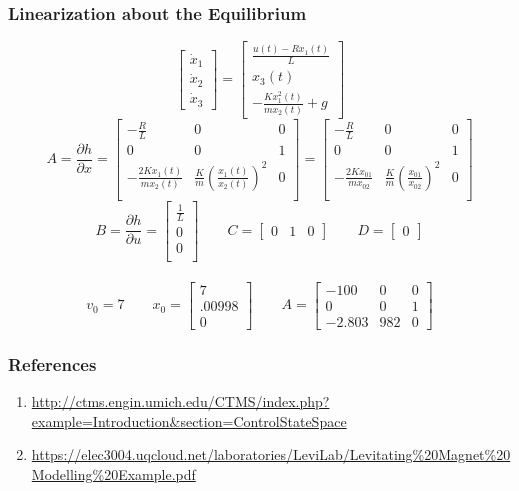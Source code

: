 \documentclass{beamer}
\begin{document}
\begin{frame}
\frametitle{Linearization about the Equilibrium}
$$
\begin{bmatrix}
\dot{x}_1 \\
\dot{x}_2 \\
\dot{x}_3
\end{bmatrix}
=
\begin{bmatrix}
\frac{u(t)-Rx_1(t)}{L} \\
x_3(t) \\
-\frac{Kx_1^2(t)}{mx_2(t)} + g
\end{bmatrix}
$$
$$
A
=
\frac{\partial h}{\partial x}
=
\begin{bmatrix}
-\frac{R}{L} & 0 & 0\\
0 & 0 & 1\\
-\frac{2Kx_1(t)}{mx_2(t)} & \frac{K}{m}(\frac{x_1(t)}{x_2(t)})^2 & 0\\
\end{bmatrix}
=
\begin{bmatrix}
-\frac{R}{L} & 0 & 0\\
0 & 0 & 1\\
-\frac{2Kx_{01}}{mx_{02}} & \frac{K}{m}(\frac{x_{01}}{x_{02}})^2 & 0\\
\end{bmatrix}
$$
$$
B
=
\frac{\partial h}{\partial u}
=
\begin{bmatrix}
\frac{1}{L} \\
0 \\
0 \\
\end{bmatrix}
\qquad
C
=
\begin{bmatrix}
0 & 1 & 0
\end{bmatrix}
\qquad
D
=
\begin{bmatrix}
0
\end{bmatrix}
$$
\\
$$
v_0 = 7 \qquad
x_0
=
\begin{bmatrix}
7 \\
.00998 \\
0
\end{bmatrix}
\qquad
A
=
\begin{bmatrix}
-100 & 0 & 0 \\
0 & 0 & 1 \\
-2.803 & 982 & 0
\end{bmatrix}
$$
\end{frame}

\begin{frame}
\frametitle{References}
\begin{enumerate}[1.]
\item \url{http://ctms.engin.umich.edu/CTMS/index.php?example=Introduction\&section=ControlStateSpace}
\item \url{https://elec3004.uqcloud.net/laboratories/LeviLab/Levitating\%20Magnet\%20Modelling\%20Example.pdf}
\end{enumerate}
\end{frame}
\end{document}
